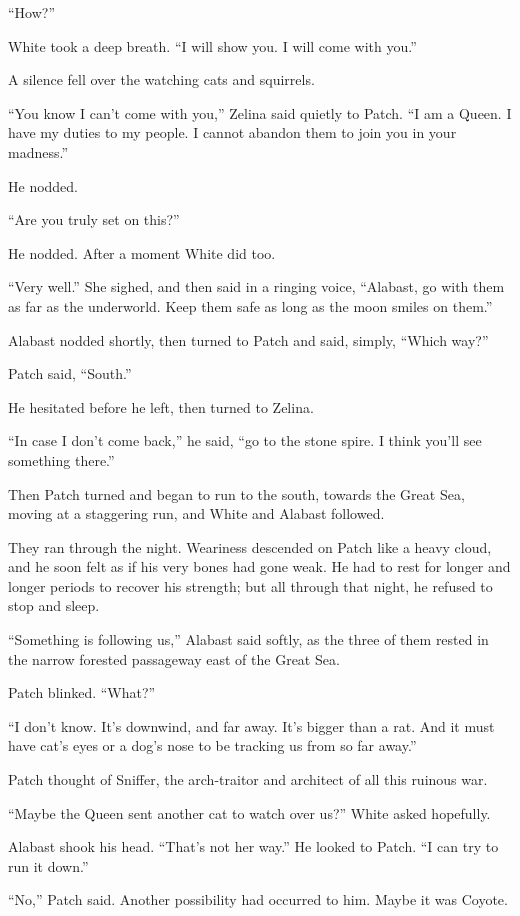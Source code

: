 \documentclass[12pt]{memoir}
\begin{document}
“How?”

White took a deep breath. “I will show you. I will come with you.”

A silence fell over the watching cats and squirrels.

“You know I can’t come with you,” Zelina said quietly to Patch. “I am
a Queen. I have my duties to my people. I cannot abandon them to join
you in your madness.”

He nodded.

“Are you truly set on this?”

He nodded. After a moment White did too.

“Very well.” She sighed, and then said in a ringing voice, “Alabast,
go with them as far as the underworld. Keep them safe as long as the
moon smiles on them.”

Alabast nodded shortly, then turned to Patch and said, simply, “Which
way?”

Patch said, “South.”

He hesitated before he left, then turned to Zelina.

“In case I don’t come back,” he said, “go to the stone spire. I think
you’ll see something there.”

Then Patch turned and began to run to the south, towards the Great
Sea, moving at a staggering run, and White and Alabast followed.

They ran through the night. Weariness descended on Patch like a heavy
cloud, and he soon felt as if his very bones had gone weak. He had to
rest for longer and longer periods to recover his strength; but all
through that night, he refused to stop and sleep.

“Something is following us,” Alabast said softly, as the three of them
rested in the narrow forested passageway east of the Great Sea.

Patch blinked. “What?”

“I don’t know. It’s downwind, and far away. It’s bigger than a
rat. And it must have cat’s eyes or a dog’s nose to be tracking us
from so far away.”

Patch thought of Sniffer, the arch-traitor and architect of all this
ruinous war.

“Maybe the Queen sent another cat to watch over us?” White asked
hopefully.

Alabast shook his head. “That’s not her way.” He looked to Patch. “I
can try to run it down.”

“No,” Patch said. Another possibility had occurred to him. Maybe it
was Coyote.
\end{document}
